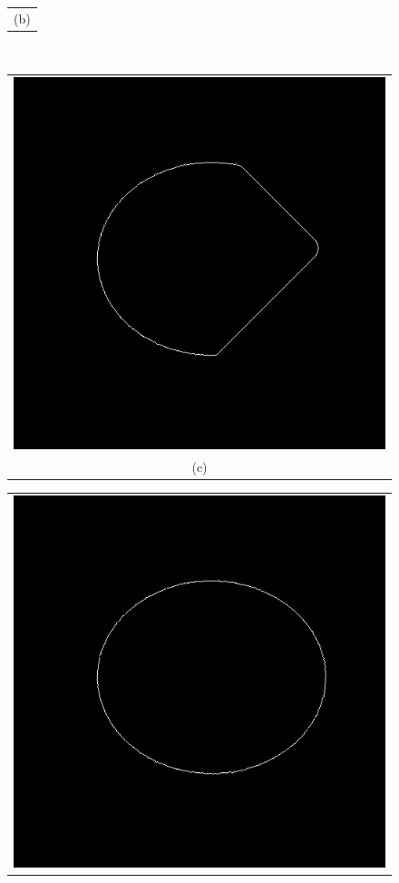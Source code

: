 \begin{figure}[h!]
\begin{minipage}{.49\textwidth}
\begin{tabular}{c}
(b)
\end{tabular}
\end{minipage}
\\
\begin{minipage}{.49\textwidth}
\begin{tabular}{c}
\includegraphics[width=.9\textwidth]{results/circleZero1600} \\
(c)
\end{tabular}
\end{minipage}
\begin{minipage}{.49\textwidth}
\begin{tabular}{c}
\includegraphics[width=.9\textwidth]{results/circleZero2200_full} \\

\end{tabular}
\end{minipage}
\end{figure}
